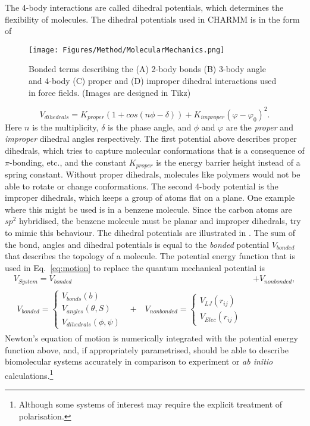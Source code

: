 The 4-body interactions are called dihedral potentials, which determines the flexibility 
of molecules. The dihedral potentials used in CHARMM is in the form of
\begin{figure}[b!]
\centering
\texttt{[image: Figures/Method/MolecularMechanics.png]}
\caption{Bonded terms describing the (A) 2-body bonds (B) 3-body angle and 4-body 
(C) proper and (D) improper dihedral interactions used in force fields. (Images 
are designed in Tikz)}
\label{method:bonded}
\end{figure}
\begin{equation}
V_{dihedrals} = K_{proper}(1+cos(n\phi - \delta)) + K_{improper}(\varphi-\varphi_{0})^2.
\end{equation}
Here $n$ is the multiplicity, $\delta$ is the phase angle, and $\phi$ and $\varphi$ are the 
{\it proper} and {\it improper} dihedral angles respectively. The first potential above describes 
proper dihedrals, which tries to capture molecular conformations that is a consequence of 
$\pi$-bonding, etc., and the constant $K_{proper}$ is the energy barrier height instead of a 
spring constant. Without proper dihedrals, molecules like polymers would not be able to rotate 
or change conformations. The second 4-body potential is the improper dihedrals, which keeps 
a group of atoms flat on a plane. One example where this might be used is in a benzene 
molecule. Since the carbon atoms are $sp^{2}$ hybridised, the benzene molecule must be planar 
and improper dihedrals, try to mimic this behaviour. The dihedral potentials are illustrated in 
. The sum of the bond, angles and dihedral potentials 
is equal to the \textit{bonded} potential $V_{bonded}$ that describes the topology of a molecule. 
The potential energy function that is used in Eq.~\eqref{eq:motion} to replace the quantum 
mechanical potential is
\begin{align}
V_{System} = V_{bonded} &+ V_{nonbonded}, \nonumber\\
\begin{split}
V_{bonded}=\begin{cases} V_{bonds}(b) \\ 
V_{angles}(\theta,S) \\ 
V_{dihedrals}(\phi,\psi)\end{cases} &+ \quad
V_{nonbonded}=\begin{cases}V_{LJ}(r_{ij})
\\ V_{Elec}(r_{ij})\end{cases}
\end{split}
\end{align}
Newton's equation of motion is numerically integrated with the potential energy function above, 
and, if appropriately parametrised, should be able to describe biomolecular systems accurately 
in comparison to experiment or {\it ab initio} calculations.\footnote{Although some systems 
of interest may require the explicit treatment of polarisation.}

